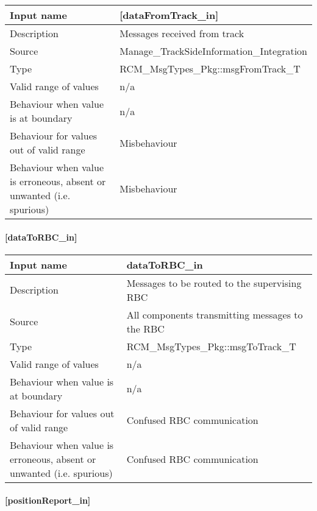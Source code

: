 \begin{longtable}{p{}p{}}
	\toprule
	Input name				& [dataFromTrack\_in] \\
	\midrule
	Description				& Messages received from track \\
	\midrule
	Source					&  Manage\_TrackSideInformation\_Integration \\ 
	\midrule
	Type					& RCM\_MsgTypes\_Pkg::msgFromTrack\_T \\
	\midrule
	Valid range of values	& n/a \\
	\midrule
	Behaviour when value is at boundary	& n/a \\
	\midrule
	Behaviour for values out of valid range	& Misbehaviour \\
	\midrule
	Behaviour when value is erroneous, absent or unwanted (i.e. spurious) & Misbehaviour \\
	\bottomrule
\end{longtable}

\paragraph{[dataToRBC\_in]}

\begin{longtable}{p{}p{}}
	\toprule
	Input name				& dataToRBC\_in \\
	\midrule
	Description				& Messages to be routed to the supervising RBC \\
	\midrule
	Source					& All components transmitting messages to the RBC \\ 
	\midrule
	Type					& RCM\_MsgTypes\_Pkg::msgToTrack\_T \\
	\midrule
	Valid range of values	& n/a \\
	\midrule
	Behaviour when value is at boundary	& n/a \\
	\midrule
	Behaviour for values out of valid range	& Confused RBC communication\\
	\midrule
	Behaviour when value is erroneous, absent or unwanted (i.e. spurious) & Confused RBC communication \\
	\bottomrule
\end{longtable}

\paragraph{[positionReport\_in]}

